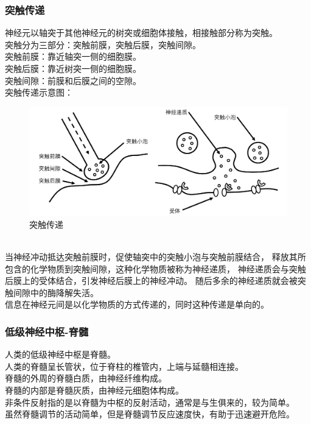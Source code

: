 \documentclass[UTF8]{ctexart}
\begin{document}
\newpage

\subsubsection{突触传递}
    神经元以轴突于其他神经元的树突或细胞体接触，相接触部分称为突触。\\[3mm]
    突触分为三部分：突触前膜，突触后膜，突触间隙。\\[3mm]
    突触前膜：靠近轴突一侧的细胞膜。\\[3mm]
    突触后膜：靠近树突一侧的细胞膜。\\[3mm]
    突触间隙：前膜和后膜之间的空隙。\\[3mm]
    突触传递示意图：
    \begin{figure}[h]
        \begin{center}
            \includegraphics[width=12cm]{BiologyImage/15.jpg}
            \caption{突触传递}
        \end{center}
    \end{figure}\\
    当神经冲动抵达突触前膜时，促使轴突中的突触小泡与突触前膜结合，
    释放其所包含的化学物质到突触间隙，这种化学物质被称为神经递质，
    神经递质会与突触后膜上的受体结合，引发神经后膜上的神经冲动。
    随后多余的神经递质就会被突触间隙中的酶降解失活。\\[2mm]
    信息在神经元间是以化学物质的方式传递的，同时这种传递是单向的。

\subsubsection{低级神经中枢-脊髓}
    人类的低级神经中枢是脊髓。\\[3mm]
    人类的脊髓呈长管状，位于脊柱的椎管内，上端与延髓相连接。\\[3mm]
    脊髓的外周的脊髓白质，由神经纤维构成。\\[3mm]
    脊髓的内部是脊髓灰质，由神经元细胞体构成。\\[6mm]
    非条件反射指的是以脊髓为中枢的反射活动，通常是与生俱来的，较为简单。\\[3mm]
    虽然脊髓调节的活动简单，但是脊髓调节反应速度快，有助于迅速避开危险。
\end{document}
